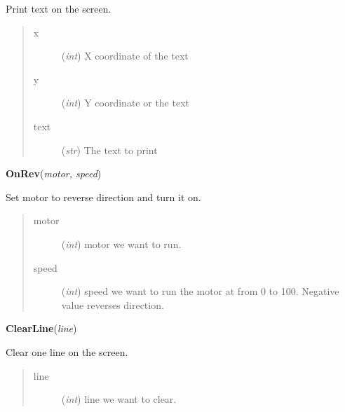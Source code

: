 \documentclass[10pt,a4paper]{article}
\begin{document}
    Print text on the screen.
    



    

\begin{quote}
    \begin{description}
        
\item[x] ({\emph{int}}) X coordinate of the text

\item[y] ({\emph{int}}) Y coordinate or the text

\item[text] ({\emph{str}}) The text to print

    \end{description}
\end{quote}

 

\vspace{6pt}
{\bf OnRev}({\it motor, speed}) 
    
    Set motor to reverse direction and turn it on.
    


    

\begin{quote}
    \begin{description}
        
\item[motor] ({\emph{int}}) motor we want to run.

\item[speed] ({\emph{int}}) speed we want to run the motor at from 0 to 100. Negative value reverses direction.

    \end{description}
\end{quote}

 

\vspace{6pt}
{\bf ClearLine}({\it line}) 
    
    Clear one line on the screen.
    

    

\begin{quote}
    \begin{description}
        
\item[line] ({\emph{int}}) line we want to clear.

    \end{description}
\end{quote}
\end{document}
